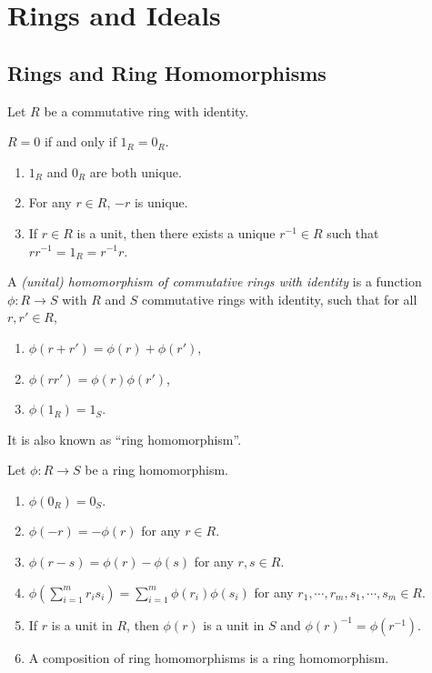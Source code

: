 \chapter{Rings and Ideals}

\section*{Rings and Ring Homomorphisms}

Let $R$ be a commutative ring with identity.

\begin{fact}
    $R = 0$ if and only if $1_R = 0_R$.
\end{fact}

\begin{fact}
    \begin{enumerate}
        \item $1_R$ and $0_R$ are both unique.
        \item For any $r \in R$, $-r$ is unique.
        \item If $r \in R$ is a unit, then there exists a unique $r^{-1} \in R$ such that $rr^{-1} = 1_R = r^{-1}r$.
    \end{enumerate}
\end{fact}

\begin{definition}
    A \emph{(unital) homomorphism of commutative rings with identity} is a function $\phi: R \to S$ with $R$ and $S$ commutative rings with identity, such that for all $r,r' \in R$,
    \begin{enumerate}
        \item $\phi(r+r') = \phi(r) + \phi(r')$,
        \item $\phi(rr') = \phi(r) \phi(r')$,
        \item $\phi(1_R) = 1_S$.
    \end{enumerate}
    It is also known as ``ring homomorphism''.
\end{definition}

\begin{fact}
    Let $\phi: R \to S$ be a ring homomorphism.
    \begin{enumerate}
        \item $\phi(0_R) = 0_S$.
        \item $\phi(-r) = -\phi(r)$ for any $r \in R$.
        \item $\phi(r-s) = \phi(r) - \phi(s)$ for any $r,s \in R$.
        \item $\phi(\sum_{i=1}^mr_is_i) = \sum_{i=1}^m\phi(r_i)\phi(s_i)$ for any $r_1,\cdots,r_m,s_1,\cdots,s_m \in R$.
        \item If $r$ is a unit in $R$, then $\phi(r)$ is a unit in $S$ and $\phi(r)^{-1} = \phi(r^{-1})$.
        \item A composition of ring homomorphisms is a ring homomorphism.
    \end{enumerate}
\end{fact}

